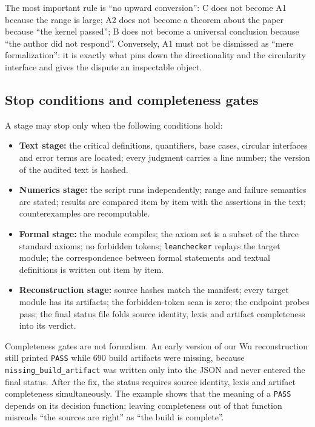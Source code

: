 \documentclass[11pt,a4paper]{article}
\theoremstyle{plain}
\theoremstyle{definition}
\begin{document}
The most important rule is ``no upward conversion'': C does not become A1 because the range is large; A2 does not become a theorem about the paper because ``the kernel passed''; B does not become a universal conclusion because ``the author did not respond''. Conversely, A1 must not be dismissed as ``mere formalization'': it is exactly what pins down the directionality and the circularity interface and gives the dispute an inspectable object.

\subsection{Stop conditions and completeness gates}
\label{sec:stops}

A stage may stop only when the following conditions hold:

\begin{itemize}
\item \textbf{Text stage:} the critical definitions, quantifiers, base cases, circular interfaces and error terms are located; every judgment carries a line number; the version of the audited text is hashed.
\item \textbf{Numerics stage:} the script runs independently; range and failure semantics are stated; results are compared item by item with the assertions in the text; counterexamples are recomputable.
\item \textbf{Formal stage:} the module compiles; the axiom set is a subset of the three standard axioms; no forbidden tokens; \texttt{leanchecker} replays the target module; the correspondence between formal statements and textual definitions is written out item by item.
\item \textbf{Reconstruction stage:} source hashes match the manifest; every target module has its artifacts; the forbidden-token scan is zero; the endpoint probes pass; the final status file folds source identity, lexis and artifact completeness into its verdict.
\end{itemize}

Completeness gates are not formalism. An early version of our Wu reconstruction still printed \texttt{PASS} while 690 build artifacts were missing, because \texttt{missing\_build\_artifact} was written only into the JSON and never entered the final status. After the fix, the status requires source identity, lexis and artifact completeness simultaneously. The example shows that the meaning of a \texttt{PASS} depends on its decision function; leaving completeness out of that function misreads ``the sources are right'' as ``the build is complete''.
\end{document}
